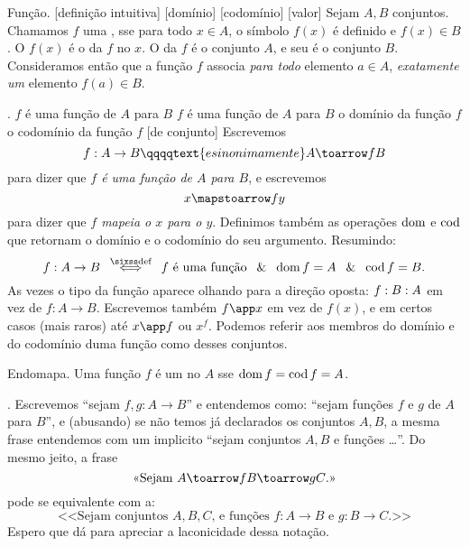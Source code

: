 \pseudodefinition Função.
\label{function_pseudodefinition}%
%
%
[definição intuitiva]%
[domínio]%
[codomínio]%
[valor]%
Sejam $A,B$ conjuntos.
Chamamos $f$ uma , sse
para todo $x \in A$, o símbolo $f(x)$ é definido e $f(x)\in B$.
O $f(x)$ é o  da $f$ no $x$.
O  da $f$ é o conjunto $A$,
e seu  é o conjunto $B$.
Consideramos então que a função $f$ associa \emph{para todo} elemento $a \in A$,
\emph{exatamente um} elemento $f(a) \in B$.

.
\label{function_notation}%
 {$f$ é uma função de $A$ para $B$}%
 {$f$ é uma função de $A$ para $B$}%
 {o domínio da função $f$}%
 {o codomínio da função $f$}%
[de conjunto]%
Escrevemos
$$
f : A \to B
\qqqqtext{e sinonimamente}
A \toarrow f B
$$
para dizer que \emph{$f$ é uma função de $A$ para $B$},
e escrevemos
$$
x \mapstoarrow f y
$$
para dizer que \emph{$f$ mapeia o $x$ para o $y$}.
Definimos também as operações $\operatorname{dom}$ e $\operatorname{cod}$
que retornam o domínio e o codomínio do seu argumento.
Resumindo:
$$
f : A \to B
\quad\defiff\quad
\text{$f$ é uma função}
\;\mland\;
\dom f = A
\;\mland\;
\cod f = B.
$$
As vezes o tipo da função aparece olhando para a direção oposta:
$f : B : A$ em vez de $f : A \to B$.
Escrevemos também $f\app x$ em vez de $f(x)$,
e em certos casos (mais raros) até $x\app f$ ou $x^f$.
Podemos referir aos membros do domínio e do codomínio duma
função como  desses conjuntos.

 Endomapa.
\label{endomapping}%
%
Uma função $f$ é um  no $A$ sse $\operatorname{dom} f = \operatorname{cod} f = A$.

\note.
Escrevemos ``sejam $f,g : A \to B$'' e entendemos como:
``sejam funções $f$ e $g$ de $A$ para $B$'', e (abusando) se não temos já
declarados os conjuntos $A,B$, a mesma frase entendemos com um implicito
``sejam conjuntos $A,B$ e funções \dots''.
Do mesmo jeito, a frase
$$
\text{<<{Sejam $A \toarrow f B \toarrow g C$.}>>}
$$
pode se equivalente com a:
$$
\text{<<{Sejam conjuntos $A,B,C$, e funções $f:A\to B$ e $g:B\to C$.}>>}
$$
Espero que dá para apreciar a laconicidade dessa notação.

